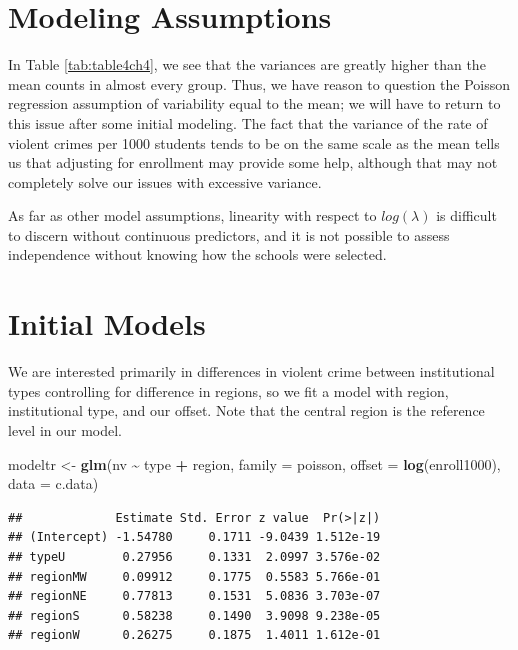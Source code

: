 \documentclass[
]{krantz}
\newenvironment{Shaded}{\begin{snugshade}}{\end{snugshade}}
\newcommand{\AttributeTok}[1]{\textcolor[rgb]{0.27,0.27,0.27}{#1}}
\newcommand{\FunctionTok}[1]{\textcolor[rgb]{0.27,0.27,0.27}{\textbf{#1}}}
\newcommand{\NormalTok}[1]{#1}
\newcommand{\OtherTok}[1]{\textcolor[rgb]{0.37,0.37,0.37}{#1}}
\newcommand{\SpecialCharTok}[1]{\textcolor[rgb]{0.43,0.43,0.43}{\textbf{#1}}}
\begin{document}
\section{Modeling Assumptions}\label{modeling-assumptions}

In Table \ref{tab:table4ch4}, we see that the variances are greatly higher than the mean counts in almost every group. Thus, we have reason to question the Poisson regression assumption of variability equal to the mean; we will have to return to this issue after some initial modeling. The fact that the variance of the rate of violent crimes per 1000 students tends to be on the same scale as the mean tells us that adjusting for enrollment may provide some help, although that may not completely solve our issues with excessive variance.

As far as other model assumptions, linearity with respect to \(log(\lambda)\) is difficult to discern without continuous predictors, and it is not possible to assess independence without knowing how the schools were selected.

\section{Initial Models}\label{initial-models}

We are interested primarily in differences in violent crime between institutional types controlling for difference in regions, so we fit a model with region, institutional type, and our offset. Note that the central region is the reference level in our model.

\begin{Shaded}
\begin{Highlighting}[]
\NormalTok{modeltr }\OtherTok{\textless{}{-}} \FunctionTok{glm}\NormalTok{(nv }\SpecialCharTok{\textasciitilde{}}\NormalTok{ type }\SpecialCharTok{+}\NormalTok{ region, }\AttributeTok{family =}\NormalTok{ poisson,}
               \AttributeTok{offset =} \FunctionTok{log}\NormalTok{(enroll1000), }\AttributeTok{data =}\NormalTok{ c.data)}
\end{Highlighting}
\end{Shaded}

\begin{verbatim}
##             Estimate Std. Error z value  Pr(>|z|)
## (Intercept) -1.54780     0.1711 -9.0439 1.512e-19
## typeU        0.27956     0.1331  2.0997 3.576e-02
## regionMW     0.09912     0.1775  0.5583 5.766e-01
## regionNE     0.77813     0.1531  5.0836 3.703e-07
## regionS      0.58238     0.1490  3.9098 9.238e-05
## regionW      0.26275     0.1875  1.4011 1.612e-01
\end{verbatim}
\end{document}
